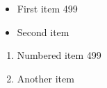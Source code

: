 \documentclass{article}
\begin{document}
\begin{itemize}
\item First item 499
\item Second item
\end{itemize}
\begin{enumerate}
\item Numbered item 499
\item Another item
\end{enumerate}
\end{document}
